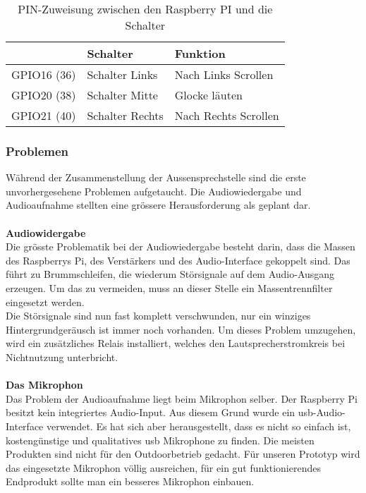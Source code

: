 \begin{table}[]
	\centering
	\label{my-label}
	\begin{tabular}{l|ll}
		\multicolumn{1}{r|}{} \textbf{Pi GPIO (PIN)} & \textbf{Schalter} & \textbf{Funktion} \hspace{60pt}	\\ \hline
		GPIO16 (36)	&	Schalter Links		&	Nach Links Scrollen	\\ \hline
		GPIO20 (38)	&	Schalter Mitte		&	Glocke läuten		\\ \hline
		GPIO21 (40)	&	Schalter Rechts		&	Nach Rechts Scrollen		\\ \hline
	\end{tabular}
	\caption{PIN-Zuweisung zwischen den Raspberry PI und die Schalter}
	\label{tbl:pinroutesdoor}
\end{table}

\subsubsection{Problemen}
Während der Zusammenstellung der Aussensprechstelle sind die erste unvorhergesehene Problemen aufgetaucht. Die Audiowiedergabe und Audioaufnahme stellten eine grössere Herausforderung als geplant dar.
\\
\\
\textbf{Audiowidergabe} 
\\
Die grösste Problematik bei der Audiowiedergabe besteht darin, dass die Massen des Raspberrys Pi, des Verstärkers und des Audio-Interface gekoppelt sind. Das führt zu Brummschleifen, die wiederum Störsignale auf dem Audio-Ausgang erzeugen. Um das zu vermeiden, muss an dieser Stelle ein Massentrennfilter eingesetzt werden.
\\
Die Störsignale sind nun fast komplett verschwunden, nur ein winziges Hintergrundgeräusch ist immer noch vorhanden. Um dieses Problem umzugehen, wird ein zusätzliches Relais installiert, welches den Lautsprecherstromkreis bei Nichtnutzung unterbricht.
\\
\\
\textbf{Das Mikrophon}
\\
Das Problem der Audioaufnahme liegt beim Mikrophon selber. Der Raspberry Pi besitzt kein integriertes Audio-Input. Aus diesem Grund wurde ein \gls{usb}-Audio-Interface verwendet. Es hat sich aber herausgestellt, dass es nicht so einfach ist, kostengünstige und qualitatives \gls{usb} Mikrophone zu finden. Die meisten Produkten sind nicht für den Outdoorbetrieb gedacht. Für unseren Prototyp wird das eingesetzte Mikrophon völlig ausreichen, für ein gut funktionierendes Endprodukt sollte man ein besseres Mikrophon einbauen.
\newpage